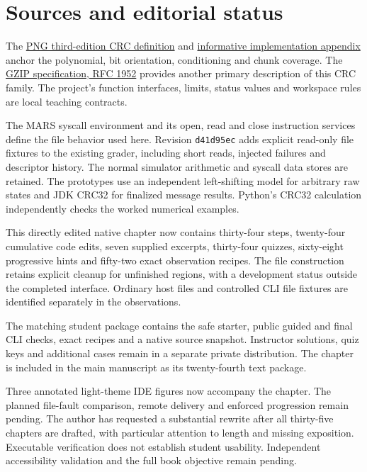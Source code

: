 \section*{Sources and editorial status}
The \href{https://www.w3.org/TR/2025/REC-png-3-20250624/\#5CRC-algorithm}{PNG third-edition CRC definition}
and \href{https://www.w3.org/TR/2025/REC-png-3-20250624/\#D-CRCAppendix}{informative implementation appendix}
anchor the polynomial, bit orientation, conditioning and chunk coverage. The
\href{https://www.rfc-editor.org/rfc/rfc1952.html}{GZIP specification, RFC 1952}
provides another primary description of this CRC family. The project's function
interfaces, limits, status values and workspace rules are local teaching contracts.

The MARS syscall environment and its open, read and close instruction services define
the file behavior used here. Revision \texttt{d41d95ec} adds explicit read-only file
fixtures to the existing grader, including short reads, injected failures and descriptor
history. The normal simulator arithmetic and syscall data stores are retained.
The prototypes use an independent left-shifting model for arbitrary raw states and
JDK CRC32 for finalized message results. Python's CRC32 calculation independently
checks the worked numerical examples.

This directly edited native chapter now contains thirty-four steps, twenty-four
cumulative code edits, seven supplied excerpts, thirty-four quizzes, sixty-eight
progressive hints and fifty-two exact observation recipes. The file construction
retains explicit cleanup for unfinished regions, with a development status outside
the completed interface. Ordinary host files and controlled CLI file fixtures are
identified separately in the observations.

The matching student package contains the safe starter, public guided and final CLI
checks, exact recipes and a native source snapshot. Instructor solutions, quiz keys and
additional cases remain in a separate private distribution. The chapter is included in
the main manuscript as its twenty-fourth text package.

Three annotated light-theme IDE figures now accompany the chapter. The planned
file-fault comparison, remote delivery and enforced progression remain pending.
The author has requested a substantial rewrite after all thirty-five chapters are
drafted, with particular attention to length and missing exposition. Executable
verification does not establish student usability. Independent accessibility validation
and the full book objective remain pending.
